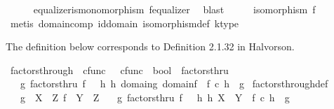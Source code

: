 \begin{isabellebody}
\ \ \ \ \isamarkupfalse%
\ equalizer{\isacharunderscore}{\kern0pt}is{\isacharunderscore}{\kern0pt}monomorphism\ f{\isacharunderscore}{\kern0pt}equalizer\ \isamarkupfalse%
\ blast\isanewline
\ \ \isamarkupfalse%
\ \isamarkupfalse%
\ {\isachardoublequoteopen}isomorphism\ f{\isachardoublequoteclose}\isanewline
\ \ \ \ \isamarkupfalse%
\ {\isacharparenleft}{\kern0pt}metis\ domain{\isacharunderscore}{\kern0pt}comp\ id{\isacharunderscore}{\kern0pt}domain\ isomorphism{\isacharunderscore}{\kern0pt}def\ k{\isacharunderscore}{\kern0pt}type{\isacharparenright}{\kern0pt}\ \ \isanewline
{}\isamarkupfalse%
%
\endisatagproof
{\isafoldproof}%
%
\isadelimproof
%
\endisadelimproof
%
\isadelimdocument
%
\endisadelimdocument
%
\isatagdocument
%
\isamarkuptrue%
%
\endisatagdocument
{\isafolddocument}%
%
\isadelimdocument
%
\endisadelimdocument
%
\begin{isamarkuptext}%
The definition below corresponds to Definition 2.1.32 in Halvorson.%
\end{isamarkuptext}\isamarkuptrue%
\isamarkupfalse%
\ factors{\isacharunderscore}{\kern0pt}through\ {\isacharcolon}{\kern0pt}{\isacharcolon}{\kern0pt}\ {\isachardoublequoteopen}cfunc\ \ {\isasymRightarrow}\ cfunc\ {\isasymRightarrow}\ bool{\isachardoublequoteclose}\ {\isacharparenleft}{\kern0pt}\ {\isachardoublequoteopen}factorsthru{\isachardoublequoteclose}\ {}{}{\isacharparenright}{\kern0pt}\isanewline
\ \ \ {\isachardoublequoteopen}g\ factorsthru\ f\ {\isasymlongleftrightarrow}\ {\isacharparenleft}{\kern0pt}{\isasymexists}\ h{\isachardot}{\kern0pt}\ {\isacharparenleft}{\kern0pt}h{\isacharcolon}{\kern0pt}\ domain{\isacharparenleft}{\kern0pt}g{\isacharparenright}{\kern0pt}{\isasymrightarrow}\ domain{\isacharparenleft}{\kern0pt}f{\isacharparenright}{\kern0pt}{\isacharparenright}{\kern0pt}\ {\isasymand}\ f\ {\isasymcirc}\isactrlsub c\ h\ {\isacharequal}{\kern0pt}\ g{\isacharparenright}{\kern0pt}{\isachardoublequoteclose}\isanewline
\isanewline
{}\isamarkupfalse%
\ factors{\isacharunderscore}{\kern0pt}through{\isacharunderscore}{\kern0pt}def{}{\isacharcolon}{\kern0pt}\isanewline
\ \ \ {\isachardoublequoteopen}g\ {\isacharcolon}{\kern0pt}\ X\ {\isasymrightarrow}\ Z{\isachardoublequoteclose}\ {\isachardoublequoteopen}f\ {\isacharcolon}{\kern0pt}\ Y\ {\isasymrightarrow}\ Z{\isachardoublequoteclose}\isanewline
\ \ \ {\isachardoublequoteopen}g\ factorsthru\ f\ {\isasymlongleftrightarrow}\ {\isacharparenleft}{\kern0pt}{\isasymexists}\ h{\isachardot}{\kern0pt}\ h{\isacharcolon}{\kern0pt}\ X\ {\isasymrightarrow}\ Y\ {\isasymand}\ f\ {\isasymcirc}\isactrlsub c\ h\ {\isacharequal}{\kern0pt}\ g{\isacharparenright}{\kern0pt}{\isachardoublequoteclose}\isanewline

\end{isabellebody}
